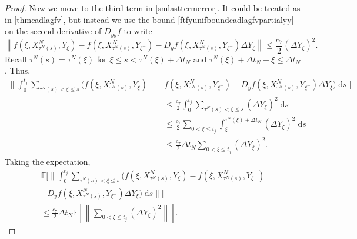 \documentclass[reqno,12pt]{amsart}
\theoremstyle{plain} %
\theoremstyle{definition} %
\begin{document}
\begin{proof}
    Now we move to the third term in \eqref{smlasttermerror}. It could be treated as in \cref{thmcadlagfv}, but instead we use the bound \eqref{ftfyunifboundcadlagfvpartialyy} on the second derivative of $D_{yy}f$ to write
    \begin{equation*}
        \left\| f(\xi, X_{\tau^N(s)}^N, Y_\xi) - f(\xi, X_{\tau^N(s)}^N, Y_{\xi^{-}}) - D_y f(\xi, X_{\tau^N(s)}^N, Y_{\xi^-}) \Delta Y_\xi \right\| \leq \frac{c_7}{2}\left( \Delta Y_\xi \right)^2.
    \end{equation*}
    Recall $\tau^N(s) = \tau^N(\xi)$ for $\xi \leq s < \tau^N(\xi) + \Delta t_N$ and $\tau^N(\xi) + \Delta t_N- \xi \leq \Delta t_N$. Thus,
    \begin{align*}
        \Bigg\|\int_0^{t_j} \sum_{\tau^N(s) < \xi \leq s} \bigg(f(\xi, X_{\tau^N(s)}^N, Y_\xi) - & f(\xi, X_{\tau^N(s)}^N, Y_{\xi^{-}}) - D_y f(\xi, X_{\tau^N(s)}^N, Y_{\xi^-})\Delta Y_\xi\bigg) \;\mathrm{d}s\Bigg\| \\
        & \leq \frac{c_7}{2}\int_0^{t_j} \sum_{\tau^N(s) < \xi \leq s} \left( \Delta Y_\xi \right)^2\;\mathrm{d}s \\
        & \leq \frac{c_7}{2}\sum_{0 < \xi \leq t_j}\int_\xi^{\tau^N(\xi) + \Delta t_N} \left( \Delta Y_\xi \right)^2\;\mathrm{d}s \\
        & \leq \frac{c_7}{2} \Delta t_N  \sum_{0 < \xi \leq t_j}\left(\Delta Y_\xi \right)^2.
    \end{align*}
    Taking the expectation,
    \begin{multline}
        \label{strongorderterm3}
        \mathbb{E}\Bigg[\Bigg\|\int_0^{t_j} \sum_{\tau^N(s) < \xi \leq s} \bigg(f(\xi, X_{\tau^N(s)}^N, Y_\xi) - f(\xi, X_{\tau^N(s)}^N, Y_{\xi^{-}}) \\
        - D_y f(\xi, X_{\tau^N(s)}^N, Y_{\xi^-})\Delta Y_\xi\bigg) \;\mathrm{d}s\Bigg\|\Bigg] \\
        \leq \frac{c_7}{2} \Delta t_N \mathbb{E}\left[\left\|\sum_{0 < \xi \leq t_j}\left( \Delta Y_\xi \right)^2\right\|\right].
    \end{multline}


\end{proof}
\end{document}
